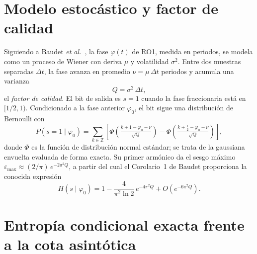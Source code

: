 \section{Modelo estocástico y factor de calidad}
\label{sec:model}

Siguiendo a Baudet \emph{et al.}~\cite{baudet_2011_security}, la fase
$\varphi(t)$ de RO1, medida en periodos, se modela como un proceso de
Wiener con deriva $\mu$ y volatilidad $\sigma^2$. Entre dos muestras
separadas $\Delta t$, la fase avanza en promedio $\nu = \mu\,\Delta t$
periodos y acumula una varianza
\begin{equation}
  Q = \sigma^2\,\Delta t ,
  \label{eq:Q}
\end{equation}
el \emph{factor de calidad}. El bit de salida es $s = 1$ cuando la fase
fraccionaria está en $[1/2, 1)$. Condicionado a la fase anterior
$\varphi_0$, el bit sigue una distribución de Bernoulli con
\begin{equation}
  P(s=1 \mid \varphi_0) = \sum_{k\in\mathbb{Z}}
  \left[\Phi\!\left(\tfrac{k+1-\varphi_0-\nu}{\sqrt{Q}}\right) -
        \Phi\!\left(\tfrac{k+\tfrac12-\varphi_0-\nu}{\sqrt{Q}}\right)\right],
  \label{eq:puno}
\end{equation}
donde $\Phi$ es la función de distribución normal estándar; se trata de la
gaussiana envuelta evaluada de forma exacta. Su primer armónico da el sesgo
máximo $\varepsilon_{\max} \approx (2/\pi)\,e^{-2\pi^2 Q}$, a partir del
cual el Corolario~1 de Baudet proporciona la conocida expresión
\begin{equation}
  H(s \mid \varphi_0) = 1 - \frac{4}{\pi^2 \ln 2}\, e^{-4\pi^2 Q}
  + O\!\left(e^{-6\pi^2 Q}\right).
  \label{eq:baudet14}
\end{equation}

\section{Entropía condicional exacta frente a la cota asintótica}
\label{sec:exact}


